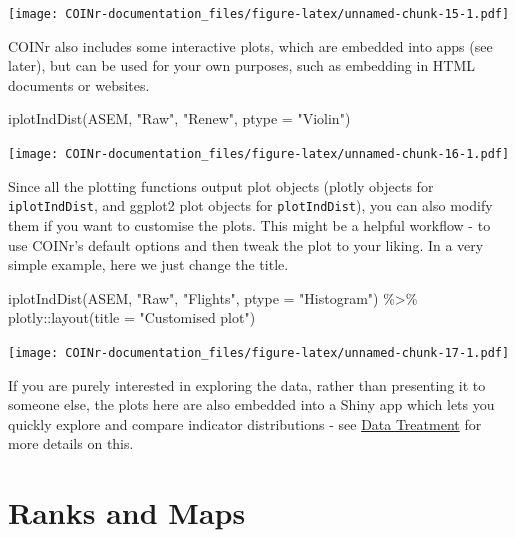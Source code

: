 \documentclass[
]{book}
\newenvironment{Shaded}{\begin{snugshade}}{\end{snugshade}}
\newcommand{\AttributeTok}[1]{\textcolor[rgb]{0.77,0.63,0.00}{#1}}
\newcommand{\FunctionTok}[1]{\textcolor[rgb]{0.00,0.00,0.00}{#1}}
\newcommand{\NormalTok}[1]{#1}
\newcommand{\SpecialCharTok}[1]{\textcolor[rgb]{0.00,0.00,0.00}{#1}}
\newcommand{\StringTok}[1]{\textcolor[rgb]{0.31,0.60,0.02}{#1}}
\begin{document}
\texttt{[image: COINr-documentation\_files/figure-latex/unnamed-chunk-15-1.pdf]}

COINr also includes some interactive plots, which are embedded into apps (see later), but can be used for your own purposes, such as embedding in HTML documents or websites.

\begin{Shaded}
\begin{Highlighting}[]
\FunctionTok{iplotIndDist}\NormalTok{(ASEM, }\StringTok{"Raw"}\NormalTok{, }\StringTok{"Renew"}\NormalTok{, }\AttributeTok{ptype =} \StringTok{"Violin"}\NormalTok{)}
\end{Highlighting}
\end{Shaded}

\texttt{[image: COINr-documentation\_files/figure-latex/unnamed-chunk-16-1.pdf]}

Since all the plotting functions output plot objects (plotly objects for \texttt{iplotIndDist}, and ggplot2 plot objects for \texttt{plotIndDist}), you can also modify them if you want to customise the plots. This might be a helpful workflow - to use COINr's default options and then tweak the plot to your liking. In a very simple example, here we just change the title.

\begin{Shaded}
\begin{Highlighting}[]
\FunctionTok{iplotIndDist}\NormalTok{(ASEM, }\StringTok{"Raw"}\NormalTok{, }\StringTok{"Flights"}\NormalTok{, }\AttributeTok{ptype =} \StringTok{"Histogram"}\NormalTok{) }\SpecialCharTok{\%\textgreater{}\%}
\NormalTok{  plotly}\SpecialCharTok{::}\FunctionTok{layout}\NormalTok{(}\AttributeTok{title =} \StringTok{"Customised plot"}\NormalTok{)}
\end{Highlighting}
\end{Shaded}

\texttt{[image: COINr-documentation\_files/figure-latex/unnamed-chunk-17-1.pdf]}

If you are purely interested in exploring the data, rather than presenting it to someone else, the plots here are also embedded into a Shiny app which lets you quickly explore and compare indicator distributions - see \protect\hyperlink{data-treatment-1}{Data Treatment} for more details on this.

\hypertarget{ranks-and-maps}{%
\section{Ranks and Maps}\label{ranks-and-maps}}
\end{document}
